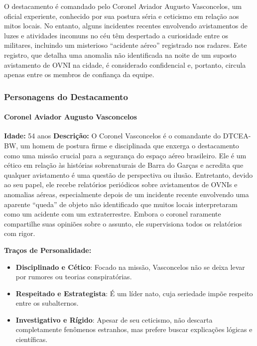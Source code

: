 O destacamento é comandado pelo Coronel Aviador Augusto Vasconcelos, um oficial experiente, conhecido por sua postura séria e ceticismo em relação aos mitos locais. No entanto, alguns incidentes recentes envolvendo avistamentos de luzes e atividades incomuns no céu têm despertado a curiosidade entre os militares, incluindo um misterioso “acidente aéreo” registrado nos radares. Este registro, que detalha uma anomalia não identificada na noite de um suposto avistamento de OVNI na cidade, é considerado confidencial e, portanto, circula apenas entre os membros de confiança da equipe.

\subsubsection{Personagens do Destacamento}

\paragraph{Coronel Aviador Augusto Vasconcelos}  
\textbf{Idade:} 54 anos  
\textbf{Descrição:}  
O Coronel Vasconcelos é o comandante do DTCEA-BW, um homem de postura firme e disciplinada que enxerga o destacamento como uma missão crucial para a segurança do espaço aéreo brasileiro. Ele é um cético em relação às histórias sobrenaturais de Barra do Garças e acredita que qualquer avistamento é uma questão de perspectiva ou ilusão. Entretanto, devido ao seu papel, ele recebe relatórios periódicos sobre avistamentos de OVNIs e anomalias aéreas, especialmente depois de um incidente recente envolvendo uma aparente “queda” de objeto não identificado que muitos locais interpretaram como um acidente com um extraterrestre. Embora o coronel raramente compartilhe suas opiniões sobre o assunto, ele supervisiona todos os relatórios com rigor.

\textbf{Traços de Personalidade:}
\begin{itemize}
    \item \textbf{Disciplinado e Cético}: Focado na missão, Vasconcelos não se deixa levar por rumores ou teorias conspiratórias.
    \item \textbf{Respeitado e Estrategista}: É um líder nato, cuja seriedade impõe respeito entre os subalternos.
    \item \textbf{Investigativo e Rígido}: Apesar de seu ceticismo, não descarta completamente fenômenos estranhos, mas prefere buscar explicações lógicas e científicas.
\end{itemize}

